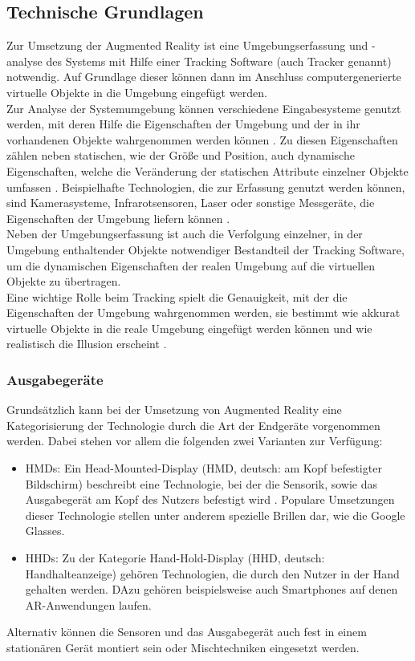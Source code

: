 \subsection{Technische Grundlagen}
Zur Umsetzung der Augmented Reality ist eine Umgebungserfassung und -analyse des Systems mit Hilfe einer Tracking Software (auch Tracker genannt) notwendig. Auf Grundlage dieser können dann im Anschluss computergenerierte virtuelle Objekte in die Umgebung eingefügt werden. \\
Zur Analyse der Systemumgebung können verschiedene Eingabesysteme genutzt werden, mit deren Hilfe die Eigenschaften der Umgebung und der in ihr vorhandenen Objekte wahrgenommen werden können \citep[S. 22]{tab:augmented-reality}. Zu diesen Eigenschaften zählen neben statischen, wie der Größe und Position, auch dynamische Eigenschaften, welche die Veränderung der statischen Attribute einzelner Objekte umfassen . Beispielhafte Technologien, die zur Erfassung genutzt werden können, sind Kamerasysteme, Infrarotsensoren, Laser oder sonstige Messgeräte, die Eigenschaften der Umgebung liefern können \citep[S. 22]{tab:augmented-reality}. \\
Neben der Umgebungserfassung ist auch die Verfolgung einzelner, in der Umgebung enthaltender Objekte notwendiger Bestandteil der Tracking Software, um die dynamischen Eigenschaften der realen Umgebung auf die virtuellen Objekte zu übertragen.\\
Eine wichtige Rolle beim Tracking spielt die Genauigkeit, mit der die Eigenschaften der Umgebung wahrgenommen werden, sie bestimmt wie akkurat virtuelle Objekte in die reale Umgebung eingefügt werden können und wie realistisch die Illusion erscheint \citep[S. 2]{klein:visual-tracking}.

\subsubsection{Ausgabegeräte}\label{sec:ausgabegeräte}
Grundsätzlich kann bei der Umsetzung von Augmented Reality eine Kategorisierung der Technologie durch die Art der Endgeräte vorgenommen werden. Dabei stehen vor allem die folgenden zwei Varianten zur Verfügung:
\begin{itemize}
\item HMDs: Ein Head-Mounted-Display (HMD, deutsch: \glqq am Kopf befestigter Bildschirm\grqq) beschreibt eine Technologie, bei der die Sensorik, sowie das Ausgabegerät am Kopf des Nutzers befestigt wird \citep[S. 44]{mehler-bicher:augmented-reality}. Populare Umsetzungen dieser Technologie stellen unter anderem spezielle Brillen dar, wie die Google Glasses.
\item HHDs: Zu der Kategorie Hand-Hold-Display (HHD, deutsch: \glqq Handhalteanzeige\grqq) gehören Technologien, die durch den Nutzer in der Hand gehalten werden. DAzu gehören beispielsweise auch Smartphones auf denen AR-Anwendungen laufen.
\end{itemize}
Alternativ können die Sensoren und das Ausgabegerät auch fest in einem stationären Gerät montiert sein \citep[S. 27]{mehler-bicher:augmented-reality} oder Mischtechniken eingesetzt werden.

